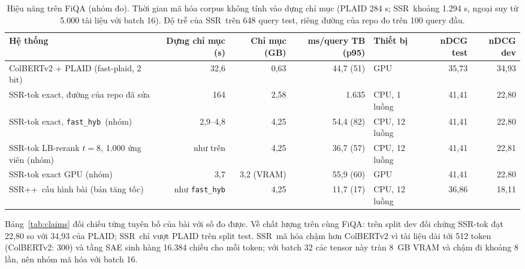 \documentclass[a4paper,13pt]{extreport}
\theoremstyle{plain}
\newcommand{\ssr}{SSR}
\newcommand{\ssrpp}{SSR++}
\newcommand{\fasthyb}{\texttt{fast\_hyb}}
\begin{document}
\begin{table}[htbp]
\centering
\caption[Hiệu năng trên FiQA (nhóm đo)]{Hiệu năng trên FiQA (nhóm đo). Thời gian mã hóa corpus không tính vào dựng chỉ mục (PLAID 284 s; \ssr\ khoảng 1.294 s, ngoại suy từ 5.000 tài liệu với batch 16). Độ trễ của \ssr\ trên 648 query test, riêng đường của repo đo trên 100 query đầu.}
\label{tab:perf}
\scriptsize
\begin{tabular}{p{3.8cm}rrrp{1.7cm}rr}
\toprule
\textbf{Hệ thống} & \textbf{Dựng chỉ mục (s)} & \textbf{Chỉ mục (GB)} & \textbf{ms/query TB (p95)} & \textbf{Thiết bị} & \textbf{nDCG test} & \textbf{nDCG dev}\\
\midrule
ColBERTv2 + PLAID (fast-plaid, 2 bit) & 32,6 & 0,63 & 44,7 (51) & GPU & 35,73 & 34,93\\
\ssr-tok exact, đường của repo đã sửa & 164 & 2,58 & 1.635 & CPU, 1 luồng & 41,41 & 22,80\\
\ssr-tok exact, \fasthyb\ (nhóm) & 2,9--4,8 & 4,25 & 54,4 (82) & CPU, 12 luồng & 41,41 & 22,80\\
\ssr-tok LB-rerank $t{=}8$, 1.000 ứng viên (nhóm) & như trên & 4,25 & 36,7 (57) & CPU, 12 luồng & 41,41 & 22,81\\
\ssr-tok exact GPU (nhóm) & 3,7 & 3,2 (VRAM) & 55,9 (60) & GPU & 41,41 & 22,80\\
\ssrpp\ cấu hình bài (bản tăng tốc) & như \fasthyb & 4,25 & 11,7 (17) & CPU, 12 luồng & 36,86 & 18,11\\
\bottomrule
\end{tabular}
\end{table}

Bảng~\ref{tab:claims} đối chiếu từng tuyên bố của bài với số đo được. Về chất lượng trên cùng FiQA: trên split dev đối chứng \ssr-tok đạt 22,80 so với 34,93 của PLAID; \ssr\ chỉ vượt PLAID trên split test. \ssr\ mã hóa chậm hơn ColBERTv2 vì tài liệu dài tới 512 token (ColBERTv2: 300) và tầng SAE sinh hàng 16.384 chiều cho mỗi token; với batch 32 các tensor này tràn 8~GB VRAM và chậm đi khoảng 8 lần, nên nhóm mã hóa với batch 16.
\end{document}
